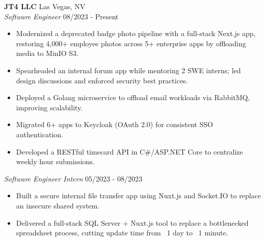 
\textbf{JT4 LLC} \hfill Las Vegas, NV \\
\textit{Software Engineer} \hfill 08/2023 - Present
\begin{itemize}[leftmargin=*, nosep]
  \item Modernized a deprecated badge photo pipeline with a full-stack Next.js app, restoring 4,000+ employee photos across 5+ enterprise apps by offloading media to MinIO S3.
  \item Spearheaded an internal forum app while mentoring 2 SWE interns; led design discussions and enforced security best practices.
  \item Deployed a Golang microservice to offload email workloads via RabbitMQ, improving scalability.
  \item Migrated 6+ apps to Keycloak (OAuth 2.0) for consistent SSO authentication.
  \item Developed a RESTful timecard API in C\#/ASP.NET Core to centralize weekly hour submissions.
\end{itemize}

\textit{Software Engineer Intern} \hfill 05/2023 - 08/2023
\begin{itemize}[leftmargin=*, nosep]
  \item Built a secure internal file transfer app using Nuxt.js and Socket.IO to replace an insecure shared system.
  \item Delivered a full-stack SQL Server + Nuxt.js tool to replace a bottlenecked spreadsheet process, cutting update time from ~1 day to ~1 minute.
\end{itemize}
